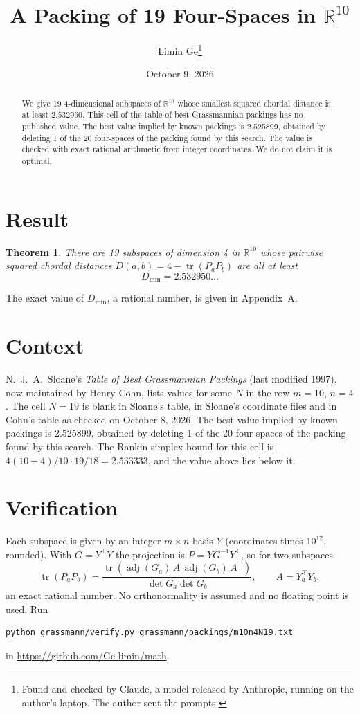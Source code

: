 \documentclass[11pt,a4paper]{article}
\title{A Packing of 19 Four-Spaces in $\mathbb{R}^{10}$}
\author{Limin Ge\thanks{Found and checked by Claude, a model released by Anthropic, running on the author's laptop. The author sent the prompts.}}
\date{October 9, 2026}
\newtheorem*{theorem}{Theorem}
\begin{document}
\maketitle
\begin{abstract}
We give 19 4-dimensional subspaces of $\mathbb{R}^{10}$ whose smallest squared chordal distance is at least 2.532950. This cell of the table of best Grassmannian packings has no published value. The best value implied by known packings is 2.525899, obtained by deleting 1 of the 20 four-spaces of the packing found by this search. The value is checked with exact rational arithmetic from integer coordinates. We do not claim it is optimal.
\end{abstract}

\section{Result}
\begin{theorem}
There are 19 subspaces of dimension 4 in $\mathbb{R}^{10}$ whose pairwise squared chordal distances $D(a,b) = 4 - \operatorname{tr}(P_aP_b)$ are all at least
\[ D_{\min} = 2.532950\ldots \]
\end{theorem}
The exact value of $D_{\min}$, a rational number, is given in Appendix~A.


\section{Context}
N.~J.~A.~Sloane's \emph{Table of Best Grassmannian Packings} (last modified 1997), now maintained by Henry Cohn, lists values for some $N$ in the row $m=10$, $n=4$. The cell $N=19$ is blank in Sloane's table, in Sloane's coordinate files and in Cohn's table as checked on October 8, 2026. The best value implied by known packings is 2.525899, obtained by deleting 1 of the 20 four-spaces of the packing found by this search. The Rankin simplex bound for this cell is $4(10-4)/10\cdot 19/18 = 2.533333$, and the value above lies below it.


\section{Verification}
Each subspace is given by an integer $m\times n$ basis $Y$ (coordinates times $10^{12}$, rounded). With $G=Y^\top Y$ the projection is $P=YG^{-1}Y^\top$, so for two subspaces
\[ \operatorname{tr}(P_aP_b)=\frac{\operatorname{tr}(\operatorname{adj}(G_a)\,A\,\operatorname{adj}(G_b)\,A^\top)}{\det G_a\det G_b},\qquad A=Y_a^\top Y_b, \]
an exact rational number. No orthonormality is assumed and no floating point is used. Run
\begin{verbatim}
python grassmann/verify.py grassmann/packings/m10n4N19.txt
\end{verbatim}
in \url{https://github.com/Ge-limin/math}.
\end{document}
